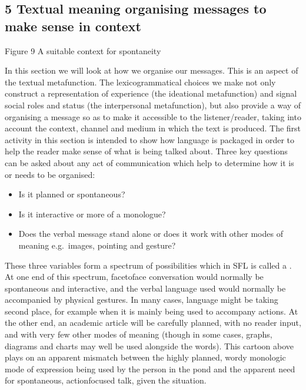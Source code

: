 \documentclass[letterpaper,10pt,english]{sphinxmanual}
\let\sphinxpxdimen\pdfpxdimen\else\newdimen\sphinxpxdimen
\begin{document}
\subsection{5 Textual meaning \textendash{} organising messages to make sense in context}
\label{\detokenize{content/session_00/Part_00_05:5-Textual-meaning-_-organising-messages-to-make-sense-in-context}}\label{\detokenize{content/session_00/Part_00_05::doc}}
\sphinxincludegraphics[width=342\sphinxpxdimen,height=300\sphinxpxdimen]{{e304_bk3_ch1_fig012_new.tif}.jpg}

Figure 9 A suitable context for spontaneity

In this section we will look at how we organise our messages. This is an aspect of the textual metafunction. The lexicogrammatical choices we make not only construct a representation of experience (the ideational metafunction) and signal social roles and status (the interpersonal metafunction), but also provide a way of organising a message so as to make it accessible to the listener/reader, taking into account the context, channel and medium in which the text is produced. The first activity in
this section is intended to show how language is packaged in order to help the reader make sense of what is being talked about. Three key questions can be asked about any act of communication which help to determine how it is or needs to be organised:
\begin{itemize}
\item {} 
Is it planned or spontaneous?

\item {} 
Is it interactive or more of a monologue?

\item {} 
Does the verbal message stand alone or does it work with other modes of meaning \textendash{} e.g. images, pointing and gesture?

\end{itemize}

These three variables form a spectrum of possibilities which in SFL is called a . At one end of this spectrum, face\sphinxhyphen{}to\sphinxhyphen{}face conversation would normally be spontaneous and interactive, and the verbal language used would normally be accompanied by physical gestures. In many cases, language might be taking second place, for example when it is mainly being used to accompany actions. At the other end, an academic article will be carefully planned, with no reader input, and with very
few other modes of meaning (though in some cases, graphs, diagrams and charts may well be used alongside the words). This cartoon above plays on an apparent mismatch between the highly planned, wordy monologic mode of expression being used by the person in the pond and the apparent need for spontaneous, action\sphinxhyphen{}focused talk, given the situation.
\end{document}
